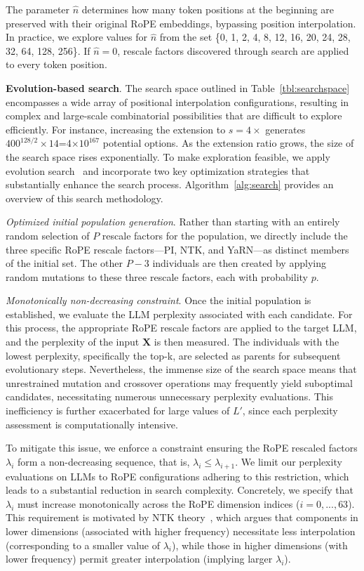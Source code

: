 The parameter $\hat{n}$ determines how many token positions at the beginning are preserved with their original RoPE embeddings, bypassing position interpolation. In practice, we explore values for $\hat{n}$ from the set \{0, 1, 2, 4, 8, 12, 16, 20, 24, 28, 32, 64, 128, 256\}. If $\hat{n}=0$, rescale factors discovered through search are applied to every token position.

\textbf{Evolution-based search}. The search space outlined in Table~\ref{tbl:searchspace} encompasses a wide array of positional interpolation configurations, resulting in complex and large-scale combinatorial possibilities that are difficult to explore efficiently. For instance, increasing the extension to $s=4\times$ generates $400^{128/2}\times14$=4$\times10^{167}$ potential options. As the extension ratio grows, the size of the search space rises exponentially. To make exploration feasible, we apply evolution search~\cite{guo2020single} and incorporate two key optimization strategies that substantially enhance the search process. Algorithm~\ref{alg:search} provides an overview of this search methodology.

\textit{Optimized initial population generation}. Rather than starting with an entirely random selection of $P$ rescale factors for the population, we directly include the three specific RoPE rescale factors—PI, NTK, and YaRN—as distinct members of the initial set. The other $P-3$ individuals are then created by applying random mutations to these three rescale factors, each with probability $p$.

\textit{Monotonically non-decreasing constraint}. Once the initial population is established, we evaluate the LLM perplexity associated with each candidate. For this process, the appropriate RoPE rescale factors are applied to the target LLM, and the perplexity of the input $\mathbf{X}$ is then measured. The individuals with the lowest perplexity, specifically the top-k, are selected as parents for subsequent evolutionary steps. Nevertheless, the immense size of the search space means that unrestrained mutation and crossover operations may frequently yield suboptimal candidates, necessitating numerous unnecessary perplexity evaluations. This inefficiency is further exacerbated for large values of $L'$, since each perplexity assessment is computationally intensive.

To mitigate this issue, we enforce a constraint ensuring the RoPE rescaled factors $\lambda_i$ form a non-decreasing sequence, that is, $\lambda_i\le \lambda_{i+1}$. We limit our perplexity evaluations on LLMs to RoPE configurations adhering to this restriction, which leads to a substantial reduction in search complexity. Concretely, we specify that $\lambda_i$ must increase monotonically across the RoPE dimension indices ($i = 0, ..., 63$). This requirement is motivated by NTK theory~\cite{jacot2018neural,tancik2020fourier,ntk}, which argues that components in lower dimensions (associated with higher frequency) necessitate less interpolation (corresponding to a smaller value of $\lambda_i$), while those in higher dimensions (with lower frequency) permit greater interpolation (implying larger $\lambda_i$).

